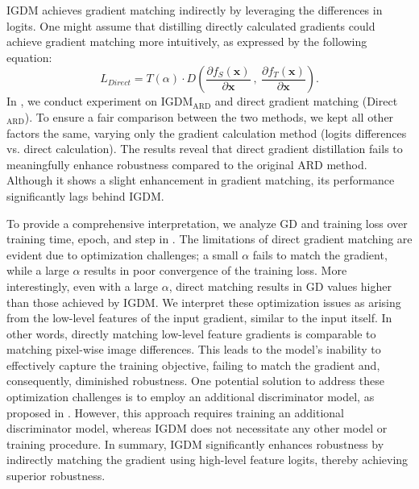 \documentclass{article} %
\begin{document}
\begin{table}[h]
\begin{tabular}{lccccc}
\bottomrule
 \end{tabular}
 \label{tab:supp_direct_alpha}
\end{table}
IGDM achieves gradient matching indirectly by leveraging the differences in logits. One might assume that distilling directly calculated gradients could achieve gradient matching more intuitively, as expressed by the following equation:
\begin{equation}
    L_{Direct} = T(\alpha) \cdot D\left (\frac{\partial f_S(\textbf{x})}{\partial \textbf{x}} \ , \ \frac{\partial f_T(\textbf{x})}{\partial \textbf{x}} \right ) .
\end{equation}
In , we conduct experiment on IGDM$_{\text{ARD}}$ and direct gradient matching (Direct$_{\text{ARD}}$).
To ensure a fair comparison between the two methods, we kept all other factors the same, varying only the gradient calculation method (logits differences vs. direct calculation).
The results reveal that direct gradient distillation fails to meaningfully enhance robustness compared to the original ARD method.
Although it shows a slight enhancement in gradient matching, its performance significantly lags behind IGDM.



To provide a comprehensive interpretation, we analyze GD and training loss over training time, epoch, and step in .
The limitations of direct gradient matching are evident due to optimization challenges; a small $\alpha$ fails to match the gradient, while a large $\alpha$ results in poor convergence of the training loss. 
More interestingly, even with a large $\alpha$, direct matching results in GD values higher than those achieved by IGDM.
We interpret these optimization issues as arising from the low-level features of the input gradient, similar to the input itself.
In other words, directly matching low-level feature gradients is comparable to matching pixel-wise image differences. 
This leads to the model's inability to effectively capture the training objective, failing to match the gradient and, consequently, diminished robustness.
One potential solution to address these optimization challenges is to employ an additional discriminator model, as proposed in \citep{chan2020thinks}.
However, this approach requires training an additional discriminator model, whereas IGDM does not necessitate any other model or training procedure.
In summary, IGDM significantly enhances robustness by indirectly matching the gradient using high-level feature logits, thereby achieving superior robustness.
\end{document}
